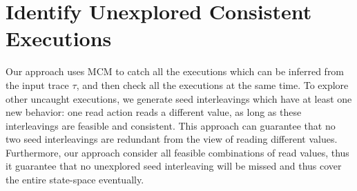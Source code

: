 \documentclass[preprint, numbers, 10pt]{sigplanconf}
\newcommand{\Ind}[1]{\hspace{#1ex}\hspace{#1ex}\hspace{#1ex}}
\begin{document}
\section{Identify Unexplored Consistent Executions}
\label{sec:identify}




Our approach uses MCM to catch all the executions which can be inferred 
from the input trace $\tau$, and then check all the executions at the same time. 
To explore other uncaught executions, we generate seed interleavings
which have at least one new behavior: one read action reads a different
value, as long as these interleavings are feasible and consistent. This approach can guarantee
that no two seed interleavings are redundant from the view of reading 
different values. Furthermore, our approach consider all feasible combinations
of read values, thus it guarantee that no unexplored seed interleaving will
be missed and thus cover the entire state-space eventually. 
\end{document}
